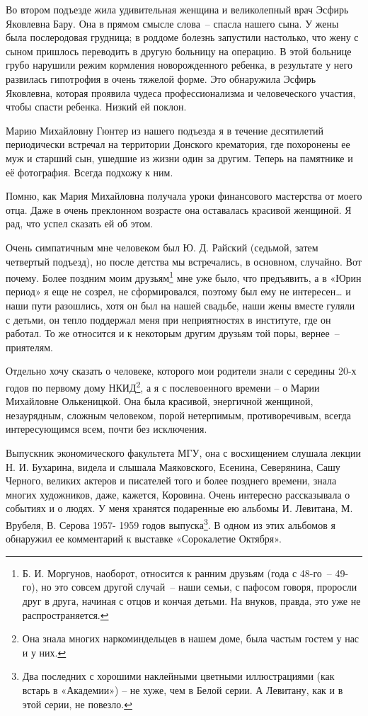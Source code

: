 \newline

Во втором подъезде жила удивительная женщина и великолепный врач Эсфирь Яковлевна Бару. Она в прямом смысле слова~-- спасла нашего сына. У жены была послеродовая грудница; в роддоме болезнь запустили настолько, что жену с сыном пришлось переводить в другую больницу на операцию. В этой больнице грубо нарушили режим кормления новорожденного ребенка, в результате у него развилась гипотрофия в очень тяжелой форме. Это обнаружила Эсфирь Яковлевна, которая проявила чудеса профессионализма и человеческого участия, чтобы спасти ребенка. Низкий ей поклон.

\newline

Марию Михайловну Гюнтер из нашего подъезда я в течение десятилетий периодически встречал на территории Донского крематория, где похоронены ее муж и старший сын, ушедшие из жизни один за другим. Теперь на памятнике и её фотография. Всегда подхожу к ним.

Помню, как Мария Михайловна получала уроки финансового мастерства от моего отца. Даже в очень преклонном возрасте она оставалась красивой женщиной. Я рад, что успел сказать ей об этом.
    
Очень симпатичным мне человеком был Ю. Д. Райский (седьмой, затем четвертый подъезд), но после детства мы встречались, в  основном, случайно. Вот почему. Более поздним моим друзьям\protect\footnote{Б. И. Моргунов, наоборот, относится к ранним друзьям (года с 48-го~-- 49-го), но это совсем другой случай~-- наши семьи, с пафосом говоря, проросли друг в друга, начиная с отцов и кончая детьми. На внуков, правда, это уже не распространяется.}  мне уже было, что предъявить, а в «Юрин период» я еще не созрел, не сформировался, поэтому был ему не интересен… и наши пути разошлись, хотя он был на нашей свадьбе, наши жены вместе гуляли с детьми, он тепло поддержал меня при неприятностях в институте, где он работал. То же относится и к некоторым другим друзьям той поры, вернее~-- приятелям.


Отдельно хочу сказать о человеке, которого мои родители знали с середины 20-х годов по первому дому НКИД\protect\footnote{Она знала многих наркоминдельцев в нашем доме, была частым гостем у нас и у них.}, а я с послевоенного времени – о Марии Михайловне Олькеницкой. Она была красивой, энергичной женщиной, незаурядным, сложным человеком, порой нетерпимым, противоречивым, всегда интересующимся всем, почти без исключения.
 
Выпускник экономического факультета МГУ, она с восхищением слушала лекции Н. И. Бухарина, видела и слышала Маяковского, Есенина, Северянина, Сашу Черного, великих актеров и писателей того и более позднего времени, знала многих художников, даже, кажется, Коровина. Очень интересно рассказывала о событиях и о людях. У меня хранятся подаренные ею альбомы И. Левитана, М. Врубеля, В. Серова  1957- 1959 годов выпуска\protect\footnote{Два последних с хорошими наклейными цветными иллюстрациями (как встарь в «Академии») – не хуже, чем в Белой серии. А Левитану, как и в этой серии, не повезло.}. В одном из этих альбомов я обнаружил ее комментарий к выставке «Сорокалетие Октября».  

